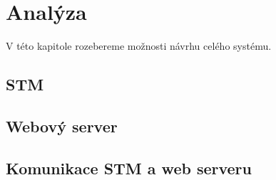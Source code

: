 \chapter{Analýza}

V této kapitole rozebereme možnosti návrhu celého systému.

\section{STM}




\section{Webový server}


\section{Komunikace STM a web serveru}

